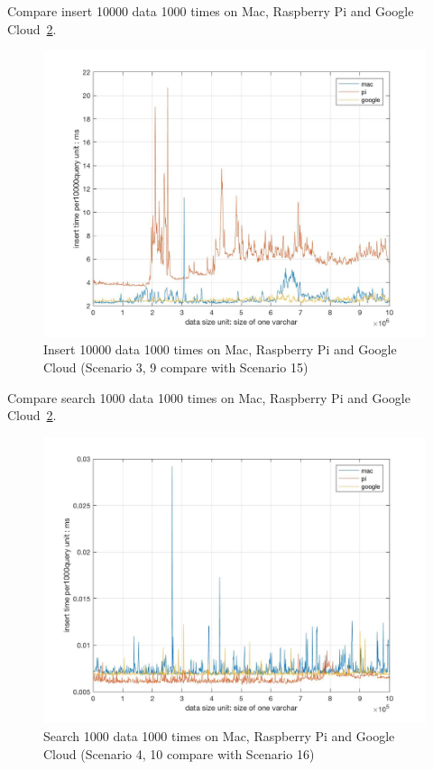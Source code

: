 Compare insert 10000 data 1000 times on Mac, Raspberry Pi and Google Cloud~\ref{f:fly}.

\begin{figure}[!ht]
  \centering\includegraphics[width=\columnwidth]
  {images/insert_comp_10000_three.jpg}
  \caption{Insert 10000 data 1000 times on  Mac, Raspberry Pi and Google Cloud
  (Scenario 3, 9 compare with Scenario 15)}\label{f:fly}
\end{figure}

Compare search 1000 data 1000 times on Mac, Raspberry Pi and Google Cloud~\ref{f:fly}.

\begin{figure}[!ht]
  \centering\includegraphics[width=\columnwidth]
  {images/search_comp_1000_three.jpg}
  \caption{Search 1000 data 1000 times on  Mac, Raspberry Pi and Google Cloud
  (Scenario 4, 10 compare with Scenario 16)}\label{f:fly}
\end{figure}


